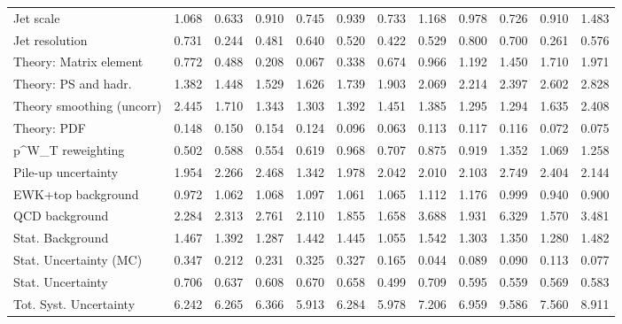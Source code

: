 \begin{tabular}{l|p{0.6cm}p{0.6cm}p{0.6cm}p{0.6cm}p{0.6cm}p{0.6cm}p{0.6cm}p{0.6cm}p{0.6cm}p{0.6cm}p{0.6cm}}
Jet scale                                & 1.068 & 0.633 & 0.910 & 0.745 & 0.939 & 0.733 & 1.168 & 0.978 & 0.726 & 0.910 & 1.483 \\
Jet resolution                           & 0.731 & 0.244 & 0.481 & 0.640 & 0.520 & 0.422 & 0.529 & 0.800 & 0.700 & 0.261 & 0.576 \\
Theory: Matrix element                   & 0.772 & 0.488 & 0.208 & 0.067 & 0.338 & 0.674 & 0.966 & 1.192 & 1.450 & 1.710 & 1.971 \\
Theory: PS and hadr.                     & 1.382 & 1.448 & 1.529 & 1.626 & 1.739 & 1.903 & 2.069 & 2.214 & 2.397 & 2.602 & 2.828 \\
Theory smoothing (uncorr)                & 2.445 & 1.710 & 1.343 & 1.303 & 1.392 & 1.451 & 1.385 & 1.295 & 1.294 & 1.635 & 2.408 \\
Theory: PDF                              & 0.148 & 0.150 & 0.154 & 0.124 & 0.096 & 0.063 & 0.113 & 0.117 & 0.116 & 0.072 & 0.075 \\
p^{W}_{T} reweighting                    & 0.502 & 0.588 & 0.554 & 0.619 & 0.968 & 0.707 & 0.875 & 0.919 & 1.352 & 1.069 & 1.258 \\
Pile-up uncertainty                      & 1.954 & 2.266 & 2.468 & 1.342 & 1.978 & 2.042 & 2.010 & 2.103 & 2.749 & 2.404 & 2.144 \\
EWK+top background                       & 0.972 & 1.062 & 1.068 & 1.097 & 1.061 & 1.065 & 1.112 & 1.176 & 0.999 & 0.940 & 0.900 \\
QCD background                           & 2.284 & 2.313 & 2.761 & 2.110 & 1.855 & 1.658 & 3.688 & 1.931 & 6.329 & 1.570 & 3.481 \\
Stat. Background                         & 1.467 & 1.392 & 1.287 & 1.442 & 1.445 & 1.055 & 1.542 & 1.303 & 1.350 & 1.280 & 1.482 \\
Stat. Uncertainty (MC)                   & 0.347 & 0.212 & 0.231 & 0.325 & 0.327 & 0.165 & 0.044 & 0.089 & 0.090 & 0.113 & 0.077 \\
\hline
Stat. Uncertainty                        & 0.706 & 0.637 & 0.608 & 0.670 & 0.658 & 0.499 & 0.709 & 0.595 & 0.559 & 0.569 & 0.583 \\
\hline
Tot. Syst. Uncertainty                   & 6.242 & 6.265 & 6.366 & 5.913 & 6.284 & 5.978 & 7.206 & 6.959 & 9.586 & 7.560 & 8.911 \\
\hline
\end{tabular}

